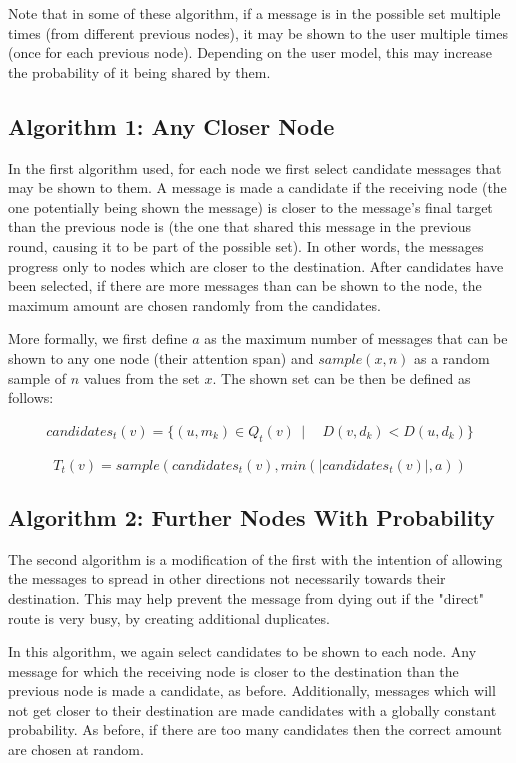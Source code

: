 \documentclass[bsc,frontabs,twoside,singlespacing,parskip,deptreport]{infthesis}     %
\begin{document}
Note that in some of these algorithm, if a message is in the possible set multiple times (from different previous nodes), it may be shown to the user multiple times (once for each previous node). Depending on the user model, this may increase the probability of it being shared by them.

\subsection{Algorithm 1: Any Closer Node}
In the first algorithm used, for each node we first select candidate messages that may be shown to them. A message is made a candidate if the receiving node (the one potentially being shown the message) is closer to the message's final target than the previous node is (the one that shared this message in the previous round, causing it to be part of the possible set). In other words, the messages progress only to nodes which are closer to the destination. After candidates have been selected, if there are more messages than can be shown to the node, the maximum amount are chosen randomly from the candidates. 

More formally, we first define $a$ as the maximum number of messages that can be shown to any one node (their attention span) and $sample(x, n)$ as a random sample of $n$ values from the set $x$. The shown set can be then be defined as follows:

\begin{equation}
\begin{split}
candidates_{t}(v) = \{ (u, m_{k}) \in Q_{t}(v) \:\: | \:\: & D(v, d_{k}) < D(u, d_{k}) \}
\end{split}
\end{equation}

\begin{equation}
T_{t}(v) = sample(candidates_{t}(v), min(|candidates_{t}(v)|, a))
\end{equation}

\subsection{Algorithm 2: Further Nodes With Probability}
The second algorithm is a modification of the first with the intention of allowing the messages to spread in other directions not necessarily towards their destination. This may help prevent the message from dying out if the "direct" route is very busy, by creating additional duplicates.

In this algorithm, we again select candidates to be shown to each node. Any message for which the receiving node is closer to the destination than the previous node is made a candidate, as before. Additionally, messages which will not get closer to their destination are made candidates with a globally constant probability. As before, if there are too many candidates then the correct amount are chosen at random.
\end{document}
